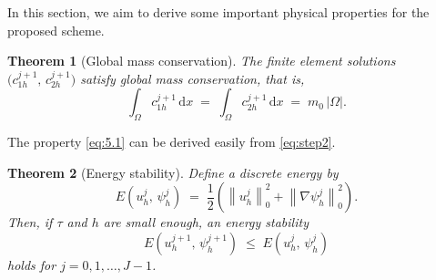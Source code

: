 \documentclass[a4paper,fleqn]{cas-sc}
\numberwithin{equation}{section}
\newtheorem{theorem}{Theorem}[section]
\theoremstyle{definition}
\begin{document}
In this section, we aim to derive some important physical properties for the proposed scheme.

\begin{theorem}[Global mass conservation]
\label{thm:mass}
The finite element solutions $\bigl(c_{1h}^{j+1},\, c_{2h}^{j+1}\bigr)$ satisfy global mass
conservation, that is,
\begin{equation}
  \int_{\Omega} c_{1h}^{j+1}\,\mathrm{d}x
  \;=\;
  \int_{\Omega} c_{2h}^{j+1}\,\mathrm{d}x
  \;=\;
  m_{0}\,|\Omega|.
  \label{eq:5.1}
\end{equation}
\end{theorem}

The property \eqref{eq:5.1} can be derived easily from \eqref{eq:step2}.

\begin{theorem}[Energy stability]
\label{thm:energy}
Define a discrete energy by
\begin{equation}
  E\!\left(u_{h}^{j},\,\psi_{h}^{j}\right)
  \;=\;
  \frac{1}{2}\left(
    \left\|u_{h}^{j}\right\|_{0}^{2}
    +
    \left\|\nabla\psi_{h}^{j}\right\|_{0}^{2}
  \right).
  \label{eq:5.2}
\end{equation}
Then, if $\tau$ and $h$ are small enough, an energy stability
\begin{equation}
  E\!\left(u_{h}^{j+1},\,\psi_{h}^{j+1}\right)
  \;\leq\;
  E\!\left(u_{h}^{j},\,\psi_{h}^{j}\right)
  \label{eq:5.3}
\end{equation}
holds for $j = 0, 1, \ldots, J-1$.
\end{theorem}
\end{document}
